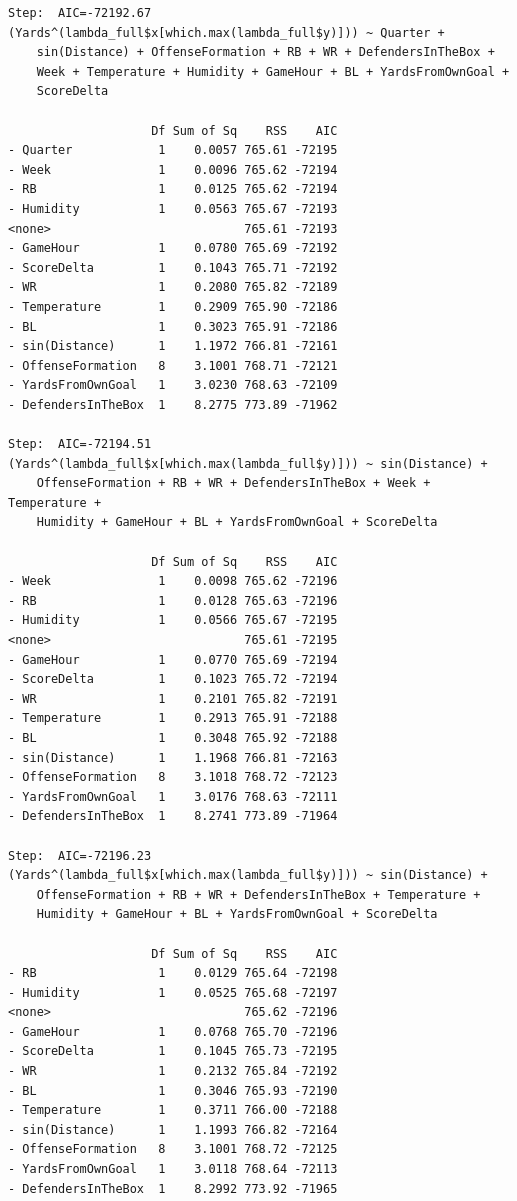 \documentclass[
  super,
  preprint,
  3p]{elsarticle}
\begin{document}
\begin{verbatim}
Step:  AIC=-72192.67
(Yards^(lambda_full$x[which.max(lambda_full$y)])) ~ Quarter + 
    sin(Distance) + OffenseFormation + RB + WR + DefendersInTheBox + 
    Week + Temperature + Humidity + GameHour + BL + YardsFromOwnGoal + 
    ScoreDelta

                    Df Sum of Sq    RSS    AIC
- Quarter            1    0.0057 765.61 -72195
- Week               1    0.0096 765.62 -72194
- RB                 1    0.0125 765.62 -72194
- Humidity           1    0.0563 765.67 -72193
<none>                           765.61 -72193
- GameHour           1    0.0780 765.69 -72192
- ScoreDelta         1    0.1043 765.71 -72192
- WR                 1    0.2080 765.82 -72189
- Temperature        1    0.2909 765.90 -72186
- BL                 1    0.3023 765.91 -72186
- sin(Distance)      1    1.1972 766.81 -72161
- OffenseFormation   8    3.1001 768.71 -72121
- YardsFromOwnGoal   1    3.0230 768.63 -72109
- DefendersInTheBox  1    8.2775 773.89 -71962

Step:  AIC=-72194.51
(Yards^(lambda_full$x[which.max(lambda_full$y)])) ~ sin(Distance) + 
    OffenseFormation + RB + WR + DefendersInTheBox + Week + Temperature + 
    Humidity + GameHour + BL + YardsFromOwnGoal + ScoreDelta

                    Df Sum of Sq    RSS    AIC
- Week               1    0.0098 765.62 -72196
- RB                 1    0.0128 765.63 -72196
- Humidity           1    0.0566 765.67 -72195
<none>                           765.61 -72195
- GameHour           1    0.0770 765.69 -72194
- ScoreDelta         1    0.1023 765.72 -72194
- WR                 1    0.2101 765.82 -72191
- Temperature        1    0.2913 765.91 -72188
- BL                 1    0.3048 765.92 -72188
- sin(Distance)      1    1.1968 766.81 -72163
- OffenseFormation   8    3.1018 768.72 -72123
- YardsFromOwnGoal   1    3.0176 768.63 -72111
- DefendersInTheBox  1    8.2741 773.89 -71964

Step:  AIC=-72196.23
(Yards^(lambda_full$x[which.max(lambda_full$y)])) ~ sin(Distance) + 
    OffenseFormation + RB + WR + DefendersInTheBox + Temperature + 
    Humidity + GameHour + BL + YardsFromOwnGoal + ScoreDelta

                    Df Sum of Sq    RSS    AIC
- RB                 1    0.0129 765.64 -72198
- Humidity           1    0.0525 765.68 -72197
<none>                           765.62 -72196
- GameHour           1    0.0768 765.70 -72196
- ScoreDelta         1    0.1045 765.73 -72195
- WR                 1    0.2132 765.84 -72192
- BL                 1    0.3046 765.93 -72190
- Temperature        1    0.3711 766.00 -72188
- sin(Distance)      1    1.1993 766.82 -72164
- OffenseFormation   8    3.1001 768.72 -72125
- YardsFromOwnGoal   1    3.0118 768.64 -72113
- DefendersInTheBox  1    8.2992 773.92 -71965


\end{verbatim}
\end{document}

